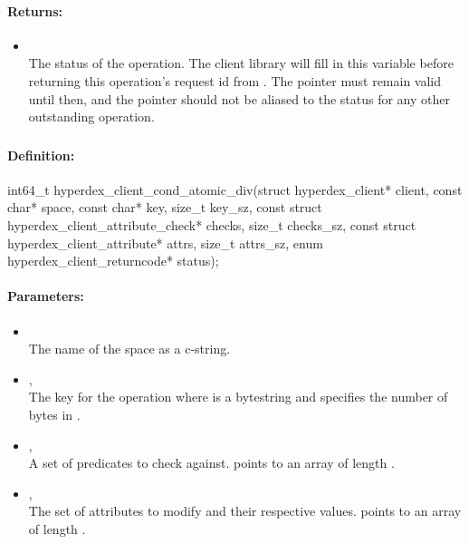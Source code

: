 \paragraph{Returns:}
\begin{itemize}[noitemsep]
\item {}\\
The status of the operation.  The client library will fill in this variable before returning this operation's request id from .  The pointer must remain valid until then, and the pointer should not be aliased to the status for any other outstanding operation.
\end{itemize}

\pagebreak
\subsubsection{}
\label{api:c:cond_atomic_div}


\paragraph{Definition:}
\begin{ccode}
int64_t hyperdex_client_cond_atomic_div(struct hyperdex_client* client,
        const char* space,
        const char* key, size_t key_sz,
        const struct hyperdex_client_attribute_check* checks, size_t checks_sz,
        const struct hyperdex_client_attribute* attrs, size_t attrs_sz,
        enum hyperdex_client_returncode* status);
\end{ccode}

\paragraph{Parameters:}
\begin{itemize}[noitemsep]
\item {}\\
The name of the space as a c-string.
\item {}, \\
The key for the operation where  is a bytestring and  specifies the number of bytes in .
\item {}, \\
A set of predicates to check against.   points to an array of length .
\item {}, \\
The set of attributes to modify and their respective values.   points to an array of length .
\end{itemize}

